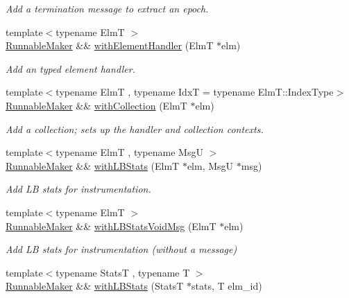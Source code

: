 \begin{DoxyCompactItemize}
\begin{DoxyCompactList}\small\item\em Add a termination message to extract an epoch. \end{DoxyCompactList}\item 
{\footnotesize template$<$typename ElmT $>$ }\\\hyperlink{structvt_1_1runnable_1_1_runnable_maker}{Runnable\+Maker} \&\& \hyperlink{structvt_1_1runnable_1_1_runnable_maker_a1b37afe7a5ab185c29e85e0d6ebbbc82}{with\+Element\+Handler} (ElmT $\ast$elm)
\begin{DoxyCompactList}\small\item\em Add an typed element handler. \end{DoxyCompactList}\item 
{\footnotesize template$<$typename ElmT , typename IdxT  = typename Elm\+T\+::\+Index\+Type$>$ }\\\hyperlink{structvt_1_1runnable_1_1_runnable_maker}{Runnable\+Maker} \&\& \hyperlink{structvt_1_1runnable_1_1_runnable_maker_aed99a9b0607da59ab7ad7ee56255fcc8}{with\+Collection} (ElmT $\ast$elm)
\begin{DoxyCompactList}\small\item\em Add a collection; sets up the handler and collection contexts. \end{DoxyCompactList}\item 
{\footnotesize template$<$typename ElmT , typename MsgU $>$ }\\\hyperlink{structvt_1_1runnable_1_1_runnable_maker}{Runnable\+Maker} \&\& \hyperlink{structvt_1_1runnable_1_1_runnable_maker_a92f6e8577ac1a9828a09bc64fe665b32}{with\+L\+B\+Stats} (ElmT $\ast$elm, MsgU $\ast$msg)
\begin{DoxyCompactList}\small\item\em Add LB stats for instrumentation. \end{DoxyCompactList}\item 
{\footnotesize template$<$typename ElmT $>$ }\\\hyperlink{structvt_1_1runnable_1_1_runnable_maker}{Runnable\+Maker} \&\& \hyperlink{structvt_1_1runnable_1_1_runnable_maker_acce9921f014ab7220f9d7b3ca57e75d5}{with\+L\+B\+Stats\+Void\+Msg} (ElmT $\ast$elm)
\begin{DoxyCompactList}\small\item\em Add LB stats for instrumentation (without a message) \end{DoxyCompactList}\item 
{\footnotesize template$<$typename StatsT , typename T $>$ }\\\hyperlink{structvt_1_1runnable_1_1_runnable_maker}{Runnable\+Maker} \&\& \hyperlink{structvt_1_1runnable_1_1_runnable_maker_aa90abf37417f61aed6c4d76bf334e0f5}{with\+L\+B\+Stats} (StatsT $\ast$stats, T elm\+\_\+id)

\end{DoxyCompactItemize}
